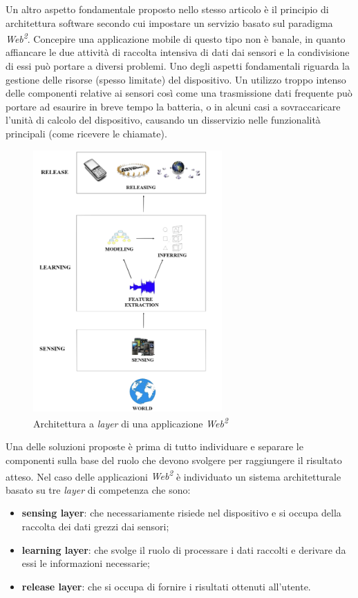 Un altro aspetto fondamentale proposto nello stesso articolo è il principio di architettura software secondo cui impostare un servizio basato sul paradigma \emph{Web\textsuperscript{2}}. Concepire una applicazione mobile di questo tipo non è banale, in quanto affiancare le due attività di raccolta intensiva di dati dai sensori e la condivisione di essi può portare a diversi problemi. Uno degli aspetti fondamentali riguarda la gestione delle risorse (spesso limitate) del dispositivo. Un utilizzo troppo intenso delle componenti relative ai sensori così come una trasmissione dati frequente può portare ad esaurire in breve tempo la batteria, o in alcuni casi a sovraccaricare l'unità di calcolo del  dispositivo, causando un disservizio nelle funzionalità principali (come ricevere le chiamate). 
\begin{figure}[ht]
  \centering
  \includegraphics[height=10cm]{images/layers}
  \caption{\footnotesize{Architettura a \emph{layer} di una applicazione \emph{Web\textsuperscript{2}}}}
  \label{fig:layers}
\end{figure}
Una delle soluzioni proposte è prima di tutto individuare e separare le componenti sulla base del ruolo che devono svolgere per raggiungere il risultato atteso. Nel caso delle applicazioni \emph{Web\textsuperscript{2}} è individuato un sistema architetturale basato su tre \emph{layer} di competenza che sono:
\begin{itemize}
  \item \textbf{sensing layer}: che necessariamente risiede nel dispositivo e si occupa della raccolta dei dati grezzi dai sensori;
  \item \textbf{learning layer}: che svolge il ruolo di processare i dati raccolti e derivare da essi le informazioni necessarie;
  \item \textbf{release layer}: che si occupa di fornire i risultati ottenuti all'utente.
\end{itemize}
